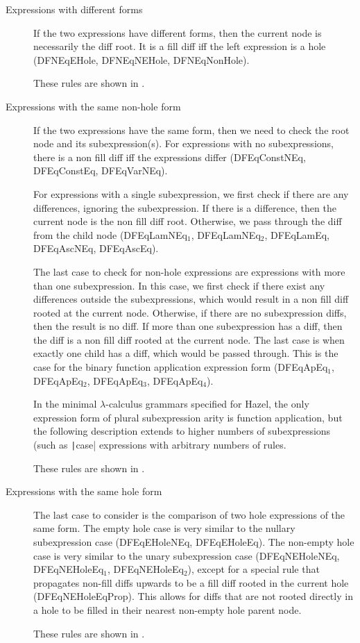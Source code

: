 \begin{description}
\item[Expressions with different forms] If the two expressions have different forms, then the current node is necessarily the diff root. It is a fill diff iff the left expression is a hole (DFNEqEHole, DFNEqNEHole, DFNEqNonHole).

  These rules are shown in .
  
\item[Expressions with the same non-hole form] If the two expressions have the same form, then we need to check the root node and its subexpression(s). For expressions with no subexpressions, there is a non fill diff iff the expressions differ (DFEqConstNEq, DFEqConstEq, DFEqVarNEq).
  
  For expressions with a single subexpression, we first check if there are any differences, ignoring the subexpression. If there is a difference, then the current node is the non fill diff root. Otherwise, we pass through the diff from the child node (DFEqLamNEq$_1$, DFEqLamNEq$_2$, DFEqLamEq, DFEqAscNEq, DFEqAscEq).

  The last case to check for non-hole expressions are expressions with more than one subexpression. In this case, we first check if there exist any differences outside the subexpressions, which would result in a non fill diff rooted at the current node. Otherwise, if there are no subexpression diffs, then the result is no diff. If more than one subexpression has a diff, then the diff is a non fill diff rooted at the current node. The last case is when exactly one child has a diff, which would be passed through. This is the case for the binary function application expression form (DFEqApEq$_1$, DFEqApEq$_2$, DFEqApEq$_3$, DFEqApEq$_4$).

  In the minimal $\lambda$-calculus grammars specified for Hazel, the only expression form of plural subexpression arity is function application, but the following description extends to higher numbers of subexpressions (such as \texttt|case| expressions with arbitrary numbers of rules.

  These rules are shown in .

\item[Expressions with the same hole form] The last case to consider is the comparison of two hole expressions of the same form. The empty hole case is very similar to the nullary subexpression case (DFEqEHoleNEq, DFEqEHoleEq). The non-empty hole case is very similar to the unary subexpression case (DFEqNEHoleNEq, DFEqNEHoleEq$_1$, DFEqNEHoleEq$_2$), except for a special rule that propagates non-fill diffs upwards to be a fill diff rooted in the current hole (DFEqNEHoleEqProp). This allows for diffs that are not rooted directly in a hole to be filled in their nearest non-empty hole parent node.

  These rules are shown in .
\end{description}
